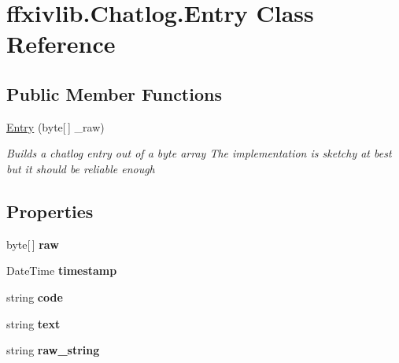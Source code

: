 \hypertarget{classffxivlib_1_1_chatlog_1_1_entry}{\section{ffxivlib.\-Chatlog.\-Entry Class Reference}
\label{classffxivlib_1_1_chatlog_1_1_entry}
}
\subsection*{Public Member Functions}
\begin{DoxyCompactItemize}
\item 
\hyperlink{classffxivlib_1_1_chatlog_1_1_entry_a39ea4531858e358a3849a74a20eeb5f7}{Entry} (byte\mbox{[}$\,$\mbox{]} \-\_\-raw)
\begin{DoxyCompactList}\small\item\em Builds a chatlog entry out of a byte array The implementation is sketchy at best but it should be reliable enough \end{DoxyCompactList}\end{DoxyCompactItemize}
\subsection*{Properties}
\begin{DoxyCompactItemize}
\item 
\hypertarget{classffxivlib_1_1_chatlog_1_1_entry_a433a573640f940b69cfe60b4e3742daf}{byte\mbox{[}$\,$\mbox{]} {\bfseries raw}}\label{classffxivlib_1_1_chatlog_1_1_entry_a433a573640f940b69cfe60b4e3742daf}

\item 
\hypertarget{classffxivlib_1_1_chatlog_1_1_entry_ae6d34aa7969faa45b9ec719f03d9623b}{Date\-Time {\bfseries timestamp}}\label{classffxivlib_1_1_chatlog_1_1_entry_ae6d34aa7969faa45b9ec719f03d9623b}

\item 
\hypertarget{classffxivlib_1_1_chatlog_1_1_entry_a4e20939b1a2b09916e4d4ab33f907c06}{string {\bfseries code}}\label{classffxivlib_1_1_chatlog_1_1_entry_a4e20939b1a2b09916e4d4ab33f907c06}

\item 
\hypertarget{classffxivlib_1_1_chatlog_1_1_entry_ab08fa27a27ed59199565acb24c596909}{string {\bfseries text}}\label{classffxivlib_1_1_chatlog_1_1_entry_ab08fa27a27ed59199565acb24c596909}

\item 
\hypertarget{classffxivlib_1_1_chatlog_1_1_entry_a38df4ab4fa8827fb8caa504c2963a9c2}{string {\bfseries raw\-\_\-string}}\label{classffxivlib_1_1_chatlog_1_1_entry_a38df4ab4fa8827fb8caa504c2963a9c2}

\end{DoxyCompactItemize}


